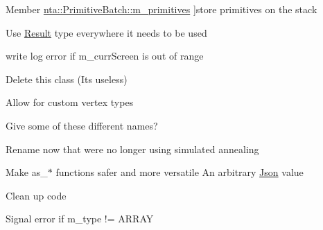 \begin{DoxyRefList}
%
Member \hyperlink{classnta_1_1PrimitiveBatch_a85b1ab0111c7d02d5899f47fe1946c4f}{nta\+:\+:Primitive\+Batch\+:\+:m\+\_\+primitives} ]store primitives on the stack  
\item[\label{todo__todo000004}%
\Hypertarget{todo__todo000004}%
Class \hyperlink{classnta_1_1Result}{nta\+:\+:Result$<$ T $>$} ]Use \hyperlink{classnta_1_1Result}{Result} type everywhere it needs to be used  
\item[\label{todo__todo000027}%
\Hypertarget{todo__todo000027}%
Member \hyperlink{classnta_1_1ScreenManager_a4b26e8adc481bfb37a088e047e4ccc2a}{nta\+:\+:Screen\+Manager\+:\+:get\+Curr\+Screen} () const]write log error if m\+\_\+curr\+Screen is out of range  
\item[\label{todo__todo000011}%
\Hypertarget{todo__todo000011}%
Class \hyperlink{classnta_1_1Sprite}{nta\+:\+:Sprite} ]Delete this class (It\textquotesingle{}s useless)  
\item[\label{todo__todo000012}%
\Hypertarget{todo__todo000012}%
Class \hyperlink{classnta_1_1SpriteBatch}{nta\+:\+:Sprite\+Batch} ]Allow for custom vertex types  
\item[\label{todo__todo000014}%
\Hypertarget{todo__todo000014}%
Member \hyperlink{classnta_1_1SpriteBatch_aa703fb92d0bd42865c21fdfb2625660d}{nta\+:\+:Sprite\+Batch\+:\+:add\+Glyph} (crvec4 pos\+Rect, crvec4 uv\+Rect, G\+Luint texture, float depth=N\+T\+A\+\_\+\+D\+E\+F\+A\+U\+L\+T\+\_\+\+D\+E\+P\+TH, crvec4 color=glm\+::vec4(1))]Give some of these different names?  
\item[\label{todo__todo000028}%
\Hypertarget{todo__todo000028}%
Member \hyperlink{classnta_1_1SpriteFont_a9dc96f31efd0830dcb476ea87534e358}{nta\+:\+:Sprite\+Font\+:\+:Sprite\+Font} (crstring font\+Path, unsigned int size)]Rename now that we\textquotesingle{}re no longer using simulated annealing  
\item[\label{todo__todo000006}%
\Hypertarget{todo__todo000006}%
Class \hyperlink{classnta_1_1utils_1_1Json}{nta\+:\+:utils\+:\+:Json} ]Make as\+\_\+$\ast$ functions safer and more versatile An arbitrary \hyperlink{classnta_1_1utils_1_1Json}{Json} value  
\item[\label{todo__todo000023}%
\Hypertarget{todo__todo000023}%
Member \hyperlink{classnta_1_1utils_1_1Json_ab0e60f7a55d12aab005d420c8f924035}{nta\+:\+:utils\+:\+:Json\+:\+:dump} (std\+::size\+\_\+t indent=0, std\+::size\+\_\+t offset=0) const]Clean up code  
\item[\label{todo__todo000021}%
\Hypertarget{todo__todo000021}%
Member \hyperlink{classnta_1_1utils_1_1Json_a893f191111e604995488d147aaa711f8}{nta\+:\+:utils\+:\+:Json\+:\+:operator\mbox{[}\mbox{]}} (std\+::size\+\_\+t idx) const]Signal error if m\+\_\+type != A\+R\+R\+AY 


\end{DoxyRefList}
